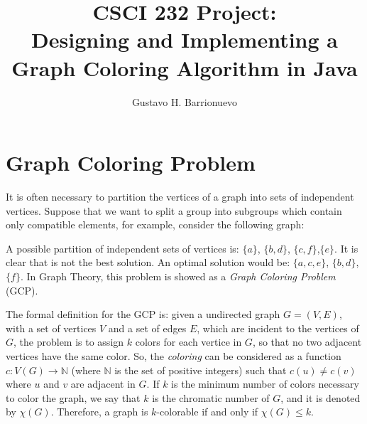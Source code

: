 \documentclass{article}
\begin{document}
\title{CSCI 232 Project: \\ Designing and Implementing a Graph Coloring Algorithm in Java}
\author{Gustavo H. Barrionuevo}

\maketitle

\section{Graph Coloring Problem}



It is often necessary to partition the vertices of a graph into sets of independent vertices. Suppose that we want to split a group into subgroups which contain only compatible elements, for example, consider the following graph:
\begin{center}
\end{center}
A possible partition of independent sets of vertices is: $\{ a \}$, $\{ b, d \}$, $ \{ c, f \}$,$ \{ e \}$. It is clear that is not the best solution. An optimal solution would be: $\{ a, c, e \} $, $ \{ b, d \}$, $ \{  f \}$. In Graph Theory, this problem is showed as a \emph{Graph Coloring Problem} (GCP)\cite{chartrand2008chromatic}.



The formal definition for the GCP is: given a undirected graph $G = (V, E)$, with a set of vertices $V$ and a set of edges $E$, which are incident to the vertices of $G$, the problem is to assign $k$ colors for each vertice in $G$, so that no two adjacent vertices have the same color. So, the \emph{coloring} can be considered as a function $c : V(G) \to \mathbb{N}$ (where $\mathbb{N}$ is the set of positive integers) such that $c(u) \neq c(v)$ where $u$ and $v$ are adjacent in $G$\cite{chartrand2008chromatic}. If $k$ is the minimum number of colors necessary to color the graph, we say that $k$ is the chromatic number of $G$, and it is denoted by $\chi(G)$. Therefore, a graph is $k$-colorable if and only if $\chi(G) \leq k$.  
\end{document}
